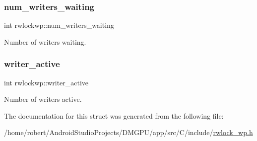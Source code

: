 \subsubsection{\texorpdfstring{num\+\_\+writers\+\_\+waiting}{num\_writers\_waiting}}
{\footnotesize\ttfamily int rwlockwp\+::num\+\_\+writers\+\_\+waiting}



Number of writers waiting. 

\mbox{\label{structrwlockwp_a729763a8ff541dbe85d809e01fbaf5ad}} 
\subsubsection{\texorpdfstring{writer\+\_\+active}{writer\_active}}
{\footnotesize\ttfamily int rwlockwp\+::writer\+\_\+active}



Number of writers active. 



The documentation for this struct was generated from the following file\+:\begin{DoxyCompactItemize}
\item 
/home/robert/\+Android\+Studio\+Projects/\+D\+M\+G\+P\+U/app/src/\+C/include/\mbox{\hyperlink{rwlock__wp_8h}{rwlock\+\_\+wp.\+h}}\end{DoxyCompactItemize}
